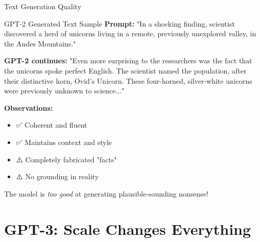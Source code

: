 \documentclass[aspectratio=169]{beamer}
\begin{document}
\begin{frame}{Text Generation Quality 📝}
    \begin{block}{GPT-2 Generated Text Sample}
        \small
        \textbf{Prompt:} "In a shocking finding, scientist discovered a herd of unicorns living in a remote, previously unexplored valley, in the Andes Mountains."

        \vspace{0.3cm}

        \textbf{GPT-2 continues:}
        "Even more surprising to the researchers was the fact that the unicorns spoke perfect English. The scientist named the population, after their distinctive horn, Ovid's Unicorn. These four-horned, silver-white unicorns were previously unknown to science..."
    \end{block}

    \vspace{0.3cm}

    \textbf{Observations:}
    \begin{itemize}\setlength{\itemsep}{0pt}
        \item ✅ Coherent and fluent
        \item ✅ Maintains context and style
        \item ⚠️ Completely fabricated "facts"
        \item ⚠️ No grounding in reality
    \end{itemize}

    \vspace{0.3cm}

    \begin{thinkaboutit}
        The model is \textit{too good} at generating plausible-sounding nonsense!
    \end{thinkaboutit}
\end{frame}

\section{GPT-3: Scale Changes Everything}
\end{document}
